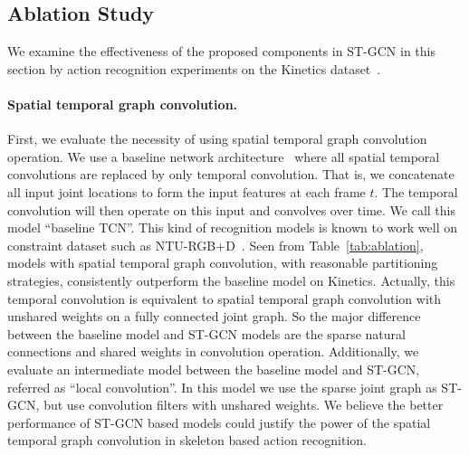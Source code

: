 \documentclass[letterpaper]{article} %
\begin{document}
\subsection{Ablation Study}\label{sec:ablation}
We examine the effectiveness of the proposed components in ST-GCN in this section by action recognition experiments on the Kinetics dataset~\cite{Kay2017Kinetics}.

\paragraph{Spatial temporal graph convolution.}
First, we evaluate the necessity of using spatial temporal graph convolution operation.
We use a baseline network architecture~\cite{Kim2017CVPRW} where all spatial temporal convolutions are replaced by only temporal convolution. That is, we concatenate all input joint locations to form the input features at each frame $ t $.
The temporal convolution will then operate on this input and convolves over time.
We call this model ``baseline TCN''.
This kind of recognition models is known to work well on constraint dataset such as NTU-RGB+D~\cite{Kim2017CVPRW}.
Seen from Table~\ref{tab:ablation}, models with spatial temporal graph convolution, with reasonable partitioning strategies, consistently outperform the baseline model on Kinetics.
Actually, this temporal convolution is equivalent to spatial temporal graph convolution with unshared weights on a fully connected joint graph.
So the major difference between the baseline model and ST-GCN models are the sparse natural connections and shared weights in convolution operation.
Additionally, we evaluate an intermediate model between the baseline model and ST-GCN, referred as ``local convolution''. 
In this model we use the sparse joint graph as ST-GCN, but use convolution filters with unshared weights.
We believe the better performance of ST-GCN based models could justify the power of the spatial temporal graph convolution in skeleton based action recognition.
\end{document}
